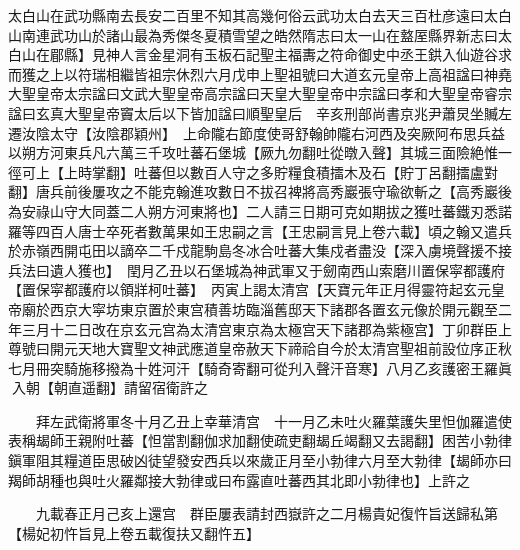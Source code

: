 太白山在武功縣南去長安二百里不知其高幾何俗云武功太白去天三百杜彦遠曰太白山南連武功山於諸山最為秀傑冬夏積雪望之皓然隋志曰太一山在盩厔縣界新志曰太白山在郿縣】見神人言金星洞有玉板石記聖主福夀之符命御史中丞王鉷入仙遊谷求而獲之上以符瑞相繼皆祖宗休烈六月戊申上聖祖號曰大道玄元皇帝上高祖諡曰神堯大聖皇帝太宗諡曰文武大聖皇帝高宗諡曰天皇大聖皇帝中宗諡曰孝和大聖皇帝睿宗諡曰玄真大聖皇帝竇太后以下皆加諡曰順聖皇后　辛亥刑部尚書京兆尹蕭炅坐贓左遷汝陰太守【汝陰郡穎州】　上命隴右節度使哥舒翰帥隴右河西及突厥阿布思兵益以朔方河東兵凡六萬三千攻吐蕃石堡城【厥九勿翻吐從暾入聲】其城三面險絶惟一徑可上【上時掌翻】吐蕃但以數百人守之多貯糧食積擂木及石【貯丁呂翻擂盧對翻】唐兵前後屢攻之不能克翰進攻數日不拔召裨將高秀巖張守瑜欲斬之【高秀巖後為安祿山守大同蓋二人朔方河東將也】二人請三日期可克如期拔之獲吐蕃鐵刃悉諾羅等四百人唐士卒死者數萬果如王忠嗣之言【王忠嗣言見上卷六載】頃之翰又遣兵於赤嶺西開屯田以謫卒二千戍龍駒島冬冰合吐蕃大集戍者盡没【深入虜境聲援不接兵法曰遺人獲也】　閏月乙丑以石堡城為神武軍又于劒南西山索磨川置保寜都護府【置保寜都護府以領牂柯吐蕃】　丙寅上謁太清宫【天寶元年正月得靈符起玄元皇帝廟於西京大寜坊東京置於東宫積善坊臨淄舊邸天下諸郡各置玄元像於開元觀至二年三月十二日改在京玄元宫為太清宫東京為太極宫天下諸郡為紫極宫】丁卯群臣上尊號曰開元天地大寶聖文神武應道皇帝赦天下禘祫自今於太清宫聖祖前設位序正秋七月冊突騎施移撥為十姓河汗【騎奇寄翻可從刋入聲汗音寒】八月乙亥護密王羅眞入朝【朝直遥翻】請留宿衛許之

　　拜左武衛將軍冬十月乙丑上幸華清宫　十一月乙未吐火羅葉護失里怛伽羅遣使表稱朅師王親附吐蕃【怛當割翻伽求加翻使疏吏翻朅丘竭翻又去謁翻】困苦小勃律鎭軍阻其糧道臣思破凶徒望發安西兵以來歲正月至小勃律六月至大勃律【朅師亦曰羯師胡種也與吐火羅鄰接大勃律或曰布露直吐蕃西其北即小勃律也】上許之

　　九載春正月己亥上還宫　群臣屢表請封西嶽許之二月楊貴妃復忤旨送歸私第【楊妃初忤旨見上卷五載復扶又翻忤五】

